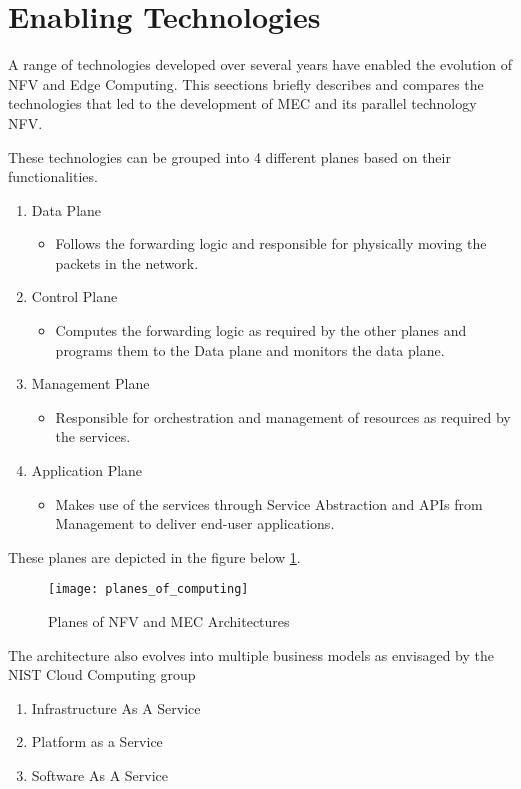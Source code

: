 \section{Enabling Technologies}

A range of technologies developed over several years have enabled the evolution of NFV and Edge Computing. This seections briefly describes and compares the technologies that led to the development of MEC and its parallel technology NFV.

These technologies can be grouped into 4 different planes based on their functionalities.

\begin{enumerate}
    \item Data Plane
	\begin{itemize}
	    \item Follows the forwarding logic and responsible for physically moving the packets in the network.
        \end{itemize}
    \item Control Plane
	\begin{itemize}
	    \item Computes the forwarding logic as required by the other planes and programs them to the Data plane and monitors the data plane.
        \end{itemize}
    \item Management Plane
	\begin{itemize}
	    \item Responsible for orchestration and management of resources as required by the services.
	\end{itemize}
    \item Application Plane
	\begin{itemize}
	    \item Makes use of the services through Service Abstraction and APIs from Management to deliver end-user applications.
	\end{itemize}
\end{enumerate}

These planes are depicted in the figure below \ref{fig:figure6}.

\begin{figure}
	\centering
        \texttt{[image: planes\_of\_computing]}
	\label{fig:figure6}
	\caption{Planes of NFV and MEC Architectures}
\end{figure}

The architecture also evolves into multiple business models as envisaged by the NIST Cloud Computing group

\begin{enumerate}
    \item Infrastructure As A Service
    \item Platform as a Service
    \item Software As A Service
\end{enumerate}
